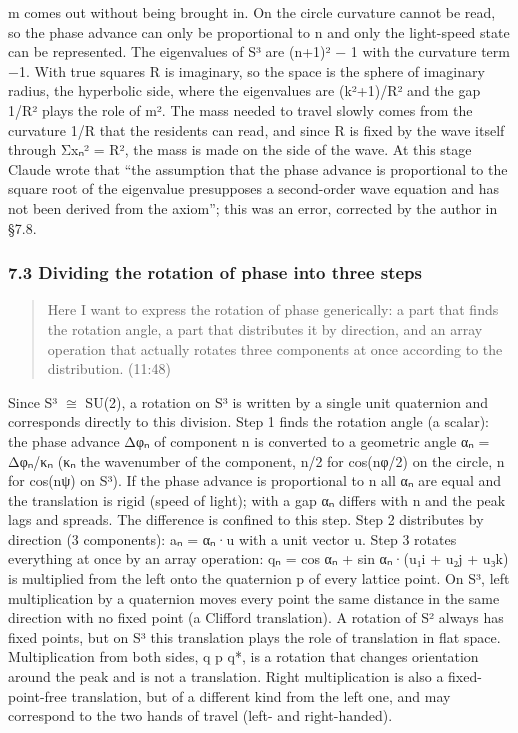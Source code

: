 \documentclass[
  a4paper,
]{article}
\begin{document}
m comes out without being brought in. On the circle curvature cannot be
read, so the phase advance can only be proportional to n and only the
light-speed state can be represented. The eigenvalues of S³ are (n+1)² −
1 with the curvature term −1. With true squares R is imaginary, so the
space is the sphere of imaginary radius, the hyperbolic side, where the
eigenvalues are (k²+1)/\textbar R\textbar² and the gap
1/\textbar R\textbar² plays the role of m². The mass needed to travel
slowly comes from the curvature 1/\textbar R\textbar{} that the
residents can read, and since R is fixed by the wave itself through Σxₙ²
= R², the mass is made on the side of the wave. At this stage Claude
wrote that ``the assumption that the phase advance is proportional to
the square root of the eigenvalue presupposes a second-order wave
equation and has not been derived from the axiom''; this was an error,
corrected by the author in §7.8.

\subsubsection{7.3 Dividing the rotation of phase into three
steps}\label{dividing-the-rotation-of-phase-into-three-steps}

\begin{quote}
Here I want to express the rotation of phase generically: a part that
finds the rotation angle, a part that distributes it by direction, and
an array operation that actually rotates three components at once
according to the distribution. (11:48)
\end{quote}

Since S³ \(\cong\) SU(2), a rotation on S³ is written by a single unit
quaternion and corresponds directly to this division. Step 1 finds the
rotation angle (a scalar): the phase advance Δφₙ of component n is
converted to a geometric angle αₙ = Δφₙ/κₙ (κₙ the wavenumber of the
component, n/2 for cos(nφ/2) on the circle, n for cos(nψ) on S³). If the
phase advance is proportional to n all αₙ are equal and the translation
is rigid (speed of light); with a gap αₙ differs with n and the peak
lags and spreads. The difference is confined to this step. Step 2
distributes by direction (3 components): aₙ = αₙ·u with a unit vector u.
Step 3 rotates everything at once by an array operation: qₙ = cos αₙ +
sin αₙ·(u₁i + u₂j + u₃k) is multiplied from the left onto the quaternion
p of every lattice point. On S³, left multiplication by a quaternion
moves every point the same distance in the same direction with no fixed
point (a Clifford translation). A rotation of S² always has fixed
points, but on S³ this translation plays the role of translation in flat
space. Multiplication from both sides, q p q*, is a rotation that
changes orientation around the peak and is not a translation. Right
multiplication is also a fixed-point-free translation, but of a
different kind from the left one, and may correspond to the two hands of
travel (left- and right-handed).
\end{document}

